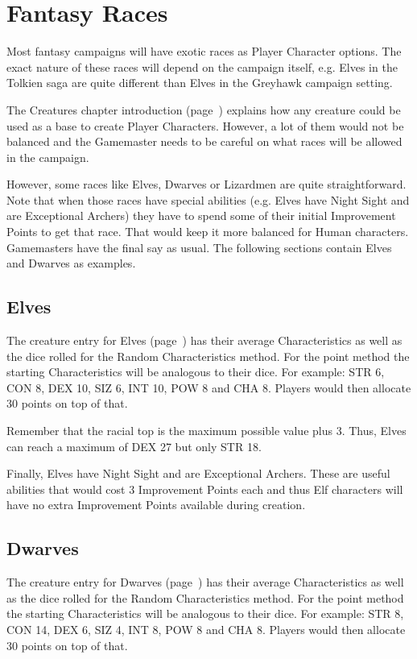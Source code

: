 

\section{Fantasy Races}
Most fantasy campaigns will have exotic races as Player Character options. The exact nature of these races will depend on the campaign itself, e.g. Elves in the Tolkien saga are quite different than Elves in the Greyhawk campaign setting.

The Creatures chapter introduction (page~\pageref{ch:creatures}) explains how any creature could be used as a base to create Player Characters. However, a lot of them would not be balanced and the Gamemaster needs to be careful on what races will be allowed in the campaign.

However, some races like Elves, Dwarves or Lizardmen are quite straightforward. Note that when those races have special abilities (e.g. Elves have Night Sight and are Exceptional Archers) they have to spend some of their initial Improvement Points to get that race. That would keep it more balanced for Human characters. Gamemasters have the final say as usual. The following sections contain Elves and Dwarves as examples. 

\subsection{Elves}
The creature entry for Elves (page~\pageref{creature:elf}) has their average Characteristics as well as the dice rolled for the Random Characteristics method. For the point method the starting Characteristics will be analogous to their dice. For example: STR 6, CON 8, DEX 10, SIZ 6, INT 10, POW 8 and CHA 8. Players would then allocate 30 points on top of that.

Remember that the racial top is the maximum possible value plus 3. Thus, Elves can reach a maximum of DEX 27 but only STR 18.

Finally, Elves have Night Sight and are Exceptional Archers. These are useful abilities that would cost 3 Improvement Points each and thus Elf characters will have no extra Improvement Points available during creation.

\subsection{Dwarves}
The creature entry for Dwarves (page~\pageref{creature:dwarf}) has their average Characteristics as well as the dice rolled for the Random Characteristics method. For the point method the starting Characteristics will be analogous to their dice. For example: STR 8, CON 14, DEX 6, SIZ 4, INT 8, POW 8 and CHA 8. Players would then allocate 30 points on top of that.

